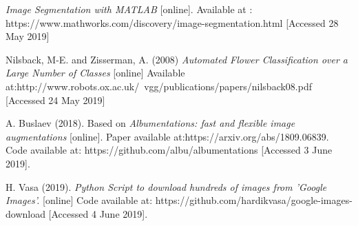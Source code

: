 \documentclass[11]{article}
\begin{document}
\newpage
\begin{thebibliography}{100}
\textit{Image Segmentation with MATLAB} [online]. Available at : https://www.mathworks.com/discovery/image-segmentation.html [Accessed 28 May 2019]


Nilsback, M-E. and Zisserman, A. (2008) \textit{Automated Flower Classification over a Large Number of Classes} [online] Available at:http://www.robots.ox.ac.uk/~vgg/publications/papers/nilsback08.pdf [Accessed 24 May 2019]


    A. Buslaev (2018). Based on \textit{Albumentations: fast and flexible image augmentations} [online]. Paper available at:https://arxiv.org/abs/1809.06839. Code available at: https://github.com/albu/albumentations  [Accessed 3 June 2019].


    H. Vasa (2019). \textit{Python Script to download hundreds of images from 'Google Images'.} [online] Code available at: https://github.com/hardikvasa/google-images-download [Accessed 4 June 2019].









\end{thebibliography}
\end{document}
